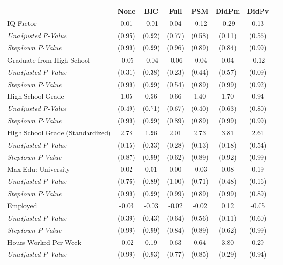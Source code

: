 \begin{tabular}{l c c c c c c c}
\toprule
 & None & BIC & Full & PSM & DidPm & DidPv \\
\midrule
IQ Factor & 0.01 & -0.01 & 0.04 & -0.12 & -0.29 & 0.13 \\
\quad \textit{Unadjusted P-Value} & (0.95) & (0.92) & (0.77) & (0.58) & (0.11) & (0.56) \\
\quad \textit{Stepdown P-Value} & (0.99) & (0.99) & (0.96) & (0.89) & (0.84) & (0.99) \\
Graduate from High School & -0.05 & -0.04 & -0.06 & -0.04 & 0.04 & -0.12 \\
\quad \textit{Unadjusted P-Value} & (0.31) & (0.38) & (0.23) & (0.44) & (0.57) & (0.09) \\
\quad \textit{Stepdown P-Value} & (0.99) & (0.99) & (0.54) & (0.89) & (0.99) & (0.92) \\
High School Grade & 1.05 & 0.56 & 0.66 & 1.40 & 1.70 & 0.94 \\
\quad \textit{Unadjusted P-Value} & (0.49) & (0.71) & (0.67) & (0.40) & (0.63) & (0.80) \\
\quad \textit{Stepdown P-Value} & (0.99) & (0.99) & (0.89) & (0.89) & (0.99) & (0.99) \\
High School Grade (Standardized) & 2.78 & 1.96 & 2.01 & 2.73 & 3.81 & 2.61 \\
\quad \textit{Unadjusted P-Value} & (0.15) & (0.33) & (0.28) & (0.13) & (0.18) & (0.54) \\
\quad \textit{Stepdown P-Value} & (0.87) & (0.99) & (0.62) & (0.89) & (0.92) & (0.99) \\
Max Edu: University & 0.02 & 0.01 & 0.00 & -0.03 & 0.08 & 0.19 \\
\quad \textit{Unadjusted P-Value} & (0.76) & (0.89) & (1.00) & (0.71) & (0.48) & (0.16) \\
\quad \textit{Stepdown P-Value} & (0.99) & (0.99) & (0.99) & (0.89) & (0.99) & (0.89) \\
Employed & -0.03 & -0.03 & -0.02 & -0.02 & 0.12 & -0.05 \\
\quad \textit{Unadjusted P-Value} & (0.39) & (0.43) & (0.64) & (0.56) & (0.11) & (0.60) \\
\quad \textit{Stepdown P-Value} & (0.99) & (0.99) & (0.84) & (0.89) & (0.62) & (0.99) \\
Hours Worked Per Week & -0.02 & 0.19 & 0.63 & 0.64 & 3.80 & 0.29 \\
\quad \textit{Unadjusted P-Value} & (0.99) & (0.93) & (0.77) & (0.85) & (0.29) & (0.94) \\

\end{tabular}
